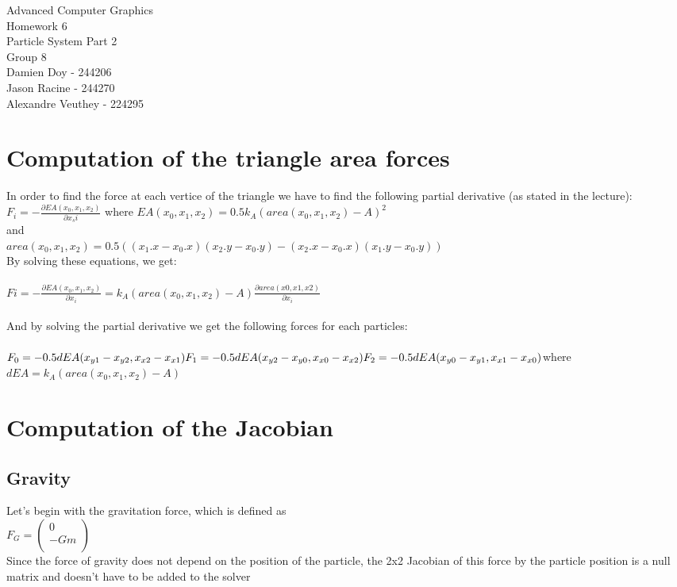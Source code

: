 \documentclass[10pt,a4paper]{report}
\begin{document}
{\LARGE \center Advanced Computer Graphics \\ Homework 6\\ Particle System Part 2\\}
{\large \center Group 8\\ Damien Doy - 244206\\
Jason Racine - 244270\\
Alexandre Veuthey - 224295\\
}

\section*{Computation of the triangle area forces}
In order to find the force at each vertice of the triangle we have to find the following partial derivative (as stated in the lecture):\\
$F_i=-\frac{\partial EA(x_0,x_1,x_2)}{\partial x_si}$ 
where 
$EA(x_0,x_1,x_2)=0.5k_A(area(x_0,x_1,x_2)-A)^2$\\
and \\
$area(x_0,x_1,x_2)=0.5((x_1.x-x_0.x)(x_2.y-x_0.y)-(x_2.x-x_0.x)(x_1.y-x_0.y))$\\
By solving these equations, we get:\\\\
$Fi=-\frac{\partial EA(x_0,x_1,x_2)}{\partial x_i}=k_A(area(x_0,x_1,x_2)-A)
\frac {\partial area(x0,x1,x2)}{\partial x_i}$\\\\
And by solving the partial derivative we get the following forces for each particles:\\\\
$F_0=-0.5dEA(x_{y1}-x_{y2}, x_{x2}-x_{x1})\\
F_1=-0.5dEA(x_{y2}-x_{y0}, x_{x0}-x_{x2})\\
F_2=-0.5dEA(x_{y0}-x_{y1}, x_{x1}-x_{x0})\\
$where $dEA=k_A(area(x_0,x_1,x_2)-A)$

\section*{Computation of the Jacobian}

\subsection*{Gravity}
Let's begin with the gravitation force, which is defined as\\
$
F_G=\begin{pmatrix}
0 \\
-Gm \\
\end{pmatrix}
$\\
Since the force of gravity does not depend on the position of the particle, the 2x2 Jacobian
of this force by the particle position is a null matrix and doesn't have to be added to the solver\\
\end{document}
